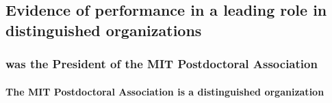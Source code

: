 \documentclass[11pt]{article}
\begin{document}
% 




\subsection{Evidence of \drs performance in a leading role in distinguished organizations}
\label{leader}


\subsubsection{\dr was the President of the MIT Postdoctoral Association}
\label{pdaleaderlabel}

\paragraph{The MIT Postdoctoral Association is a distinguished organization}\mbox{}\\

\end{document}
